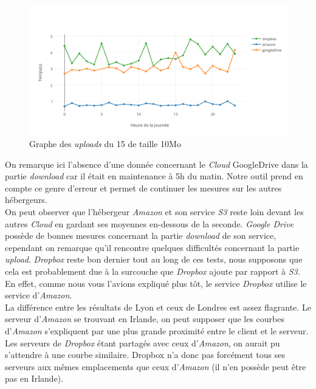 \documentclass[10pt]{article}
\begin{document}
\begin{figure}[h] \centering
\includegraphics[scale=0.65]{graphe_des_uploads_du_18022015_de_taille_10mo.png}
\caption{Graphe des \textit{uploads} du 15 de taille 10Mo} \end{figure}

On remarque ici l'absence d'une donnée concernant le \textit{Cloud}
GoogleDrive dans la partie \textit{download} car il était en maintenance à 5h
du matin. Notre outil prend en compte ce genre d'erreur et permet de continuer
les mesures sur les autres hébergeurs.\\

On peut observer que l'hébergeur \textit{Amazon} et son service \textit{S3}
reste loin devant les autres \textit{Cloud} en gardant ses moyennes
en-dessous de la seconde.  \textit{Google Drive} possède de bonnes mesures
concernant la partie \textit{download} de son service, cependant on remarque
qu'il rencontre quelques difficultés concernant la partie \textit{upload}.
\textit{Dropbox} reste bon dernier tout au long de ces tests, nous supposons
que cela est probablement due à la surcouche que \textit{Dropbox} ajoute par
rapport à \textit{S3}. En effet, comme nous vous l'avions expliqué plus tôt, le
service \textit{Dropbox} utilise le service d'\textit{Amazon}.\\

La différence entre les résultats de Lyon et ceux de Londres est assez flagrante. Le serveur d'\textit{Amazon} se trouvant en Irlande, on peut supposer que les courbes d'\textit{Amazon} s'expliquent par une plus grande proximité entre le client et le serveur. Les serveurs de \textit{Dropbox} étant partagés avec ceux d'\textit{Amazon}, on aurait pu s'attendre à une courbe similaire. Dropbox n'a donc pas forcément tous ses serveurs aux mêmes emplacements que ceux d'\textit{Amazon} (il n'en possède peut être pas en Irlande).\\
\end{document}
